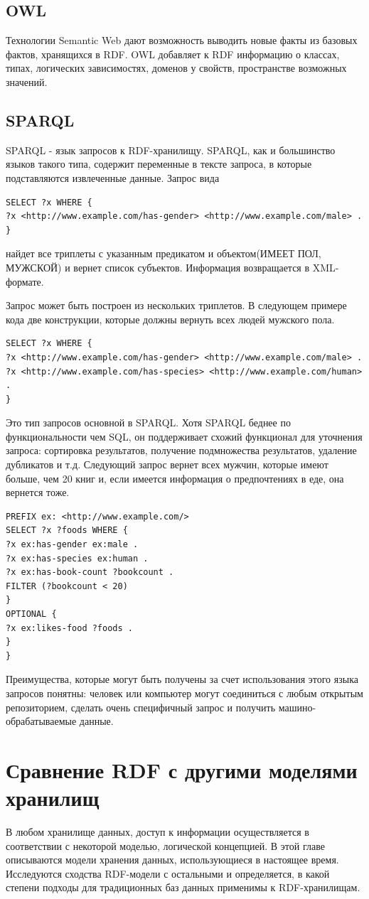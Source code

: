 \documentclass[specialist,subf,href,colorlinks=true
]{disser}
\begin{document}
\section{OWL}
Технологии Semantic Web дают возможность выводить новые факты из базовых фактов, хранящихся в RDF. OWL добавляет к RDF информацию о классах, типах, логических зависимостях, доменов у свойств, пространстве возможных значений. \cite{soloviev}
\section{SPARQL}
SPARQL - язык запросов к RDF-хранилищу. SPARQL, как и большинство языков такого типа, содержит переменные в тексте запроса, в которые подставляются извлеченные данные.
Запрос вида
\begin{lstlisting}
SELECT ?x WHERE {
?x <http://www.example.com/has-gender> <http://www.example.com/male> . 
}
\end{lstlisting}
найдет все триплеты с указанным предикатом и объектом(ИМЕЕТ ПОЛ, МУЖСКОЙ) и вернет список субъектов. Информация возвращается в XML-формате.

Запрос может быть построен из нескольких триплетов. В следующем примере кода две конструкции, которые должны вернуть всех людей мужского пола.
\begin{lstlisting}
SELECT ?x WHERE {
?x <http://www.example.com/has-gender> <http://www.example.com/male> .
?x <http://www.example.com/has-species> <http://www.example.com/human> .
}
\end{lstlisting}
Это тип запросов основной в SPARQL. Хотя SPARQL беднее по функциональности чем SQL, он поддерживает схожий функционал для уточнения запроса: сортировка результатов, получение подмножества результатов, удаление дубликатов и т.д.
Следующий запрос вернет всех мужчин, которые имеют больше, чем 20 книг и, если имеется информация о предпочтениях в еде, она вернется тоже.
\begin{lstlisting}
PREFIX ex: <http://www.example.com/>
SELECT ?x ?foods WHERE {
?x ex:has-gender ex:male .
?x ex:has-species ex:human .
?x ex:has-book-count ?bookcount .
FILTER (?bookcount < 20)
}
OPTIONAL {
?x ex:likes-food ?foods .
}
}
\end{lstlisting}
Преимущества, которые могут быть получены за счет использования этого языка запросов понятны: человек или компьютер могут соединиться с любым открытым репозиторием, сделать очень специфичный запрос и получить машино-обрабатываемые данные.
\chapter{Сравнение RDF с другими моделями хранилищ}
В любом хранилище данных, доступ к информации осуществляется в соответствии с некоторой моделью, логической концепцией. В этой главе описываются модели хранения данных, использующиеся в настоящее время. Исследуются сходства RDF-модели с остальными и определяется, в какой степени подходы для традиционных баз данных применимы к RDF-хранилищам.
\end{document}
